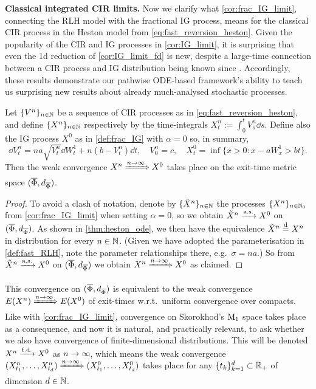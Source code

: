 \vspace{3mm}\textbf{Classical integrated CIR limits.} Now we clarify what \autoref{cor:frac_IG_limit}, connecting the RLH model with the fractional IG process, means for the classical CIR process in the Heston model from \autoref{eq:fast_reversion_heston}. Given the popularity of the CIR and IG processes in \autoref{cor:IG_limit}, it is surprising that even the 1d reduction of \autoref{cor:IG_limit_fd} is new, despite a large-time connection between a CIR process and IG distribution being known since \cite{tse_2013}. Accordingly, these results demonstrate our pathwise ODE-based framework's ability to teach us surprising new results about already much-analysed stochastic processes.

\begin{corollary}\label{cor:IG_limit}
    Let $\{V^n\}_{n\in\mathbb{N}}$ be a sequence of CIR processes as in \autoref{eq:fast_reversion_heston}, and define $\{X^n\}_{n\in\mathbb{N}}$ respectively by the time-integrals $X^n_t:=\int_0^t V^n_s\dd s$. Define also the IG process $X^0$ as in \autoref{def:frac_IG} with $\alpha=0$ so, in summary,
    \begin{equation}
        \dd V^n_t = na \sqrt{V^n_t}\dd W^1_t + n(b - V^n_t)\dd t,\quad V^n_0=c,\quad X^0_t =\inf\big\{x>0 : x - a W^1_x > bt\big\}.
    \end{equation}
    Then the weak convergence $X^n\xRightarrow{n\to\infty} X^0$ takes place on the exit-time metric space $(\overline{\Phi},d_{\overline{\Phi}})$.
\end{corollary}
\begin{proof}
    To avoid a clash of notation, denote by $\{\tilde{X}^n\}_{n\in\mathbb{N}}$ the processes $\{X^n\}_{n\in\mathbb{N}_0}$ from \autoref{cor:frac_IG_limit} when setting $\alpha=0$, so we obtain $\tilde{X}^n \xrightarrow{\mathrm{a.s.}} X^0$ on $(\overline{\Phi},d_{\overline{\Phi}})$. As shown in \autoref{thm:heston_ode}, we then have the equivalence $\tilde{X}^n\stackrel{\mathrm{d}}{=} X^n$ in distribution for every $n\in\mathbb{N}$. (Given we have adopted the parameterisation in \autoref{def:fast_RLH}, note the parameter relationships there, e.g.~$\sigma=na$.) So from $\tilde{X}^n \xrightarrow{\mathrm{a.s.}} X^0$ on $(\overline{\Phi},d_{\overline{\Phi}})$ we obtain $X^n\xRightarrow{n\to\infty} X^0$ as claimed.
\end{proof}

This convergence on $(\overline{\Phi},d_{\overline{\Phi}})$ is equivalent to the weak convergence $E(X^n)\xRightarrow{n\to\infty} E(X^0)$ of exit-times w.r.t.~uniform convergence over compacts. Like with \autoref{cor:frac_IG_limit}, convergence on Skorokhod's $\mathrm{M}_1$ space takes place as a consequence, and now it is natural, and practically relevant, to ask whether we also have convergence of finite-dimensional distributions. This will be denoted $X^n\xrightarrow{\mathrm{f.d.}} X^0$ as $n\to\infty$, which means the weak convergence $(X^n_{t_1},\dots,X^n_{t_d})\xRightarrow{n\to\infty}(X^0_{t_1},\dots,X^0_{t_d})$ takes place for any $\{t_k\}_{k=1}^d\subset\mathbb{R}_+$ of dimension $d\in\mathbb{N}$.

